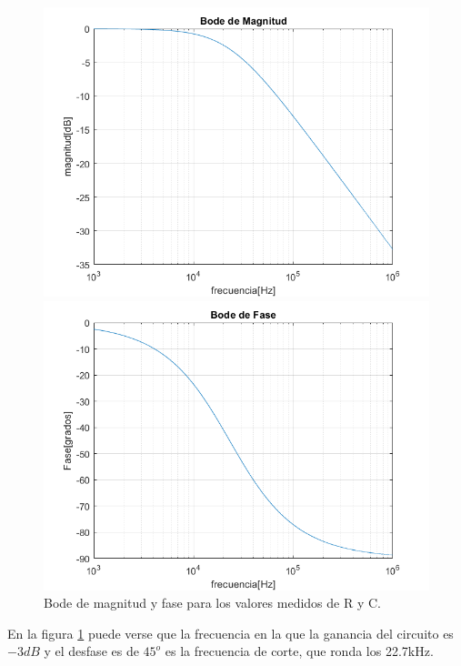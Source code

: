 \begin{figure}[H]
\centering
\begin{minipage}{.5\textwidth}
\includegraphics[scale=0.45]{1-3a.png}
\end{minipage}%
\begin{minipage}{.5\textwidth}
\includegraphics[scale=0.45]{1-3b.png}
\end{minipage}
\caption{Bode de magnitud y fase para los valores medidos de R y C.}
\label{fig:diagbodemed}
\end{figure}


En la figura \ref{fig:diagbodemed} puede verse que la frecuencia en la que la ganancia del circuito es $-3dB$ y el desfase es de $45^o$ es la frecuencia de corte, que ronda los 22.7kHz.

